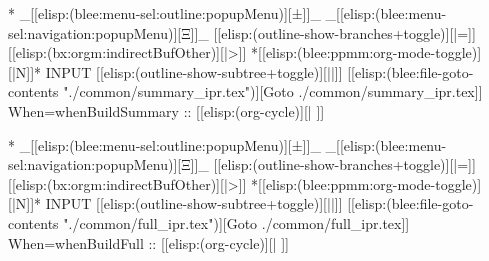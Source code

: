 


\begin{whenOrg}
*  _[[elisp:(blee:menu-sel:outline:popupMenu)][±]]_ _[[elisp:(blee:menu-sel:navigation:popupMenu)][Ξ]]_ [[elisp:(outline-show-branches+toggle)][|=]] [[elisp:(bx:orgm:indirectBufOther)][|>]] *[[elisp:(blee:ppmm:org-mode-toggle)][|N]]*  INPUT      [[elisp:(outline-show-subtree+toggle)][||]]   [[elisp:(blee:file-goto-contents "./common/summary_ipr.tex")][Goto ./common/summary_ipr.tex]] When=whenBuildSummary ::  [[elisp:(org-cycle)][| ]]
\end{whenOrg}
\begin{whenBuildPublic}
\begin{whenBuildSummary}

\end{whenBuildSummary}
\end{whenBuildPublic}

\begin{whenOrg}
*  _[[elisp:(blee:menu-sel:outline:popupMenu)][±]]_ _[[elisp:(blee:menu-sel:navigation:popupMenu)][Ξ]]_ [[elisp:(outline-show-branches+toggle)][|=]] [[elisp:(bx:orgm:indirectBufOther)][|>]] *[[elisp:(blee:ppmm:org-mode-toggle)][|N]]*  INPUT      [[elisp:(outline-show-subtree+toggle)][||]]   [[elisp:(blee:file-goto-contents "./common/full_ipr.tex")][Goto ./common/full_ipr.tex]] When=whenBuildFull ::  [[elisp:(org-cycle)][| ]]
\end{whenOrg}
\begin{whenBuildPublic}
\begin{whenBuildFull}

\end{whenBuildFull}
\end{whenBuildPublic}


